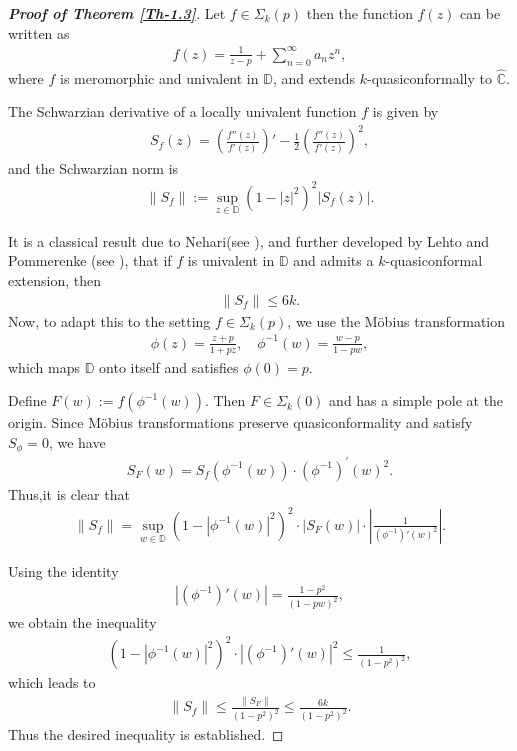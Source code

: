 \documentclass[a4paper,12pt]{amsart}
\theoremstyle{plain}
\theoremstyle{definition}
\begin{document}
\begin{proof}[\bf {Proof of Theorem \ref{Th-1.3}}]
 Let $f \in \Sigma_k(p)$ then the function $f(z)$ can be written as
	\begin{align*}
		f(z) = \frac{1}{z - p} + \sum_{n = 0}^\infty a_n z^n,
	\end{align*}
	where $f$ is meromorphic and univalent in $\mathbb{D}$, and extends $k$-quasiconformally to $\widehat{\mathbb{C}}$.
	
	\noindent The Schwarzian derivative of a locally univalent function $f$ is given by
	\begin{align*}
		S_f(z) = \left( \frac{f''(z)}{f'(z)} \right)' - \frac{1}{2} \left( \frac{f''(z)}{f'(z)} \right)^2,
	\end{align*}
	and the Schwarzian norm is
	\begin{align*}
		\|S_f\| := \sup_{z \in \mathbb{D}} (1 - |z|^2)^2 |S_f(z)|.
	\end{align*}
	
	It is a classical result due to Nehari(see \cite{Nehari-1949}), and further developed by Lehto and Pommerenke (see \cite{Pommerenke-1975,Lehto-Virtanen-1973}), that if $f$ is univalent in $\mathbb{D}$ and admits a $k$-quasiconformal extension, then
     \begin{align*}
     		\|S_f\| \leq 6k.
     \end{align*}
	Now, to adapt this to the setting $f \in \Sigma_k(p)$, we use the M\"obius transformation
	\begin{align*}
		\phi(z) = \frac{z + p}{1 + p z}, \quad \phi^{-1}(w) = \frac{w - p}{1 - p w},
	\end{align*}
	which maps $\mathbb{D}$ onto itself and satisfies $\phi(0) = p$.
	
	Define $F(w) := f(\phi^{-1}(w))$. Then $F \in \Sigma_k(0)$ and has a simple pole at the origin. Since M\"obius transformations preserve quasiconformality and satisfy $S_\phi = 0$, we have
	\begin{align*}
		S_F(w) = S_f(\phi^{-1}(w)) \cdot  (\phi^{-1})^{\prime}(w)^2.
	\end{align*}
	Thus,it is clear that
	\begin{align*}
		\|S_f\| = \sup_{w \in \mathbb{D}} (1 - |\phi^{-1}(w)|^2)^2 \cdot \left| S_F(w) \right| \cdot \left| \frac{1}{(\phi^{-1})'(w)^2} \right|.
	\end{align*}
	
	\noindent Using the identity
    \begin{align*}
		|(\phi^{-1})'(w)| = \frac{1 - p^2}{(1 - p w)^2},
    \end{align*}
	we obtain the inequality
	\begin{align*}
			(1 - |\phi^{-1}(w)|^2)^2 \cdot |(\phi^{-1})'(w)|^2 \leq \frac{1}{(1 - p^2)^2},
	\end{align*}
	which leads to
  \begin{align*}
		\|S_f\| \leq \frac{\|S_F\|}{(1 - p^2)^2} \leq \frac{6k}{(1 - p^2)^2}.
   \end{align*}
   Thus the desired inequality is established.
      

\end{proof}
\end{document}
